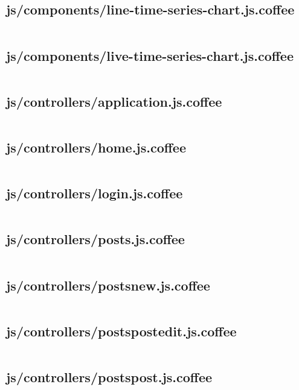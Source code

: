 \documentclass[letterpaper, 12 pt]{article}
\begin{document}
\subsection{js/components/line-time-series-chart.js.coffee}
\inputminted{ruby}{../app/assets/javascripts/components/line-time-series-chart.js.coffee}
\subsection{js/components/live-time-series-chart.js.coffee}
\inputminted{ruby}{../app/assets/javascripts/components/live-time-series-chart.js.coffee}

\subsection{js/controllers/application.js.coffee}
\inputminted{ruby}{../app/assets/javascripts/controllers/application.js.coffee}
\subsection{js/controllers/home.js.coffee}
\inputminted{ruby}{../app/assets/javascripts/controllers/home.js.coffee}
\subsection{js/controllers/login.js.coffee}
\inputminted{ruby}{../app/assets/javascripts/controllers/login.js.coffee}
\subsection{js/controllers/posts.js.coffee}
\inputminted{ruby}{../app/assets/javascripts/controllers/posts.js.coffee}
\subsection{js/controllers/posts\textunderscore new.js.coffee}
\inputminted{ruby}{../app/assets/javascripts/controllers/posts_new.js.coffee}
\subsection{js/controllers/posts\textunderscore post\textunderscore edit.js.coffee}
\inputminted{ruby}{../app/assets/javascripts/controllers/posts_post_edit.js.coffee}
\subsection{js/controllers/posts\textunderscore post.js.coffee}
\inputminted{ruby}{../app/assets/javascripts/controllers/posts_post.js.coffee}
\end{document}
